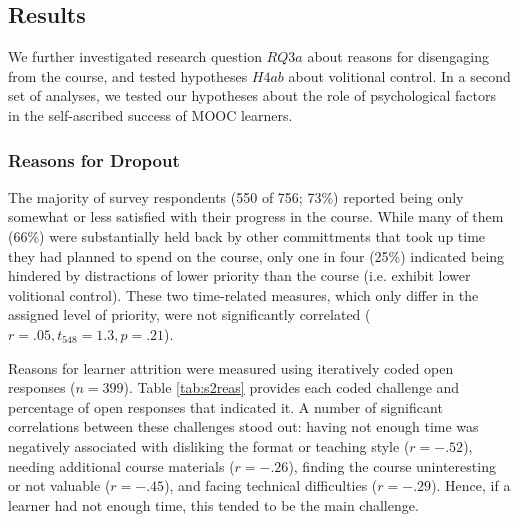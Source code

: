 \documentclass{sigchi}\usepackage[]{graphicx}\usepackage[]{color}
\begin{document}
\subsection{Results}

We further investigated research question $RQ3a$ about reasons for disengaging from the course, and tested hypotheses $H4ab$ about volitional control. In a second set of analyses, we tested our hypotheses about the role of psychological factors in the self-ascribed success of MOOC learners.



\subsubsection{Reasons for Dropout}

The majority of survey respondents (550 of 756; 73\%) reported being only somewhat or less satisfied with their progress in the course. While many of them (66\%) were substantially held back by other committments that took up time they had planned to spend on the course, only one in four (25\%) indicated being hindered by distractions of lower priority than the course (i.e. exhibit lower volitional control). These two time-related measures, which only differ in the assigned level of priority, were not significantly correlated ($r=.05, t_{548}=1.3, p=.21$).

Reasons for learner attrition were measured using iteratively coded open responses ($n=399$). Table \ref{tab:s2reas} provides each coded challenge and percentage of open responses that indicated it. A number of significant correlations between these challenges stood out: having not enough time was negatively associated with disliking the format or teaching style ($r=-.52$), needing additional course materials ($r=-.26$), finding the course uninteresting or not valuable ($r=-.45$), and facing technical difficulties ($r=-.29$). Hence, if a learner had not enough time, this tended to be the main challenge.
\end{document}
